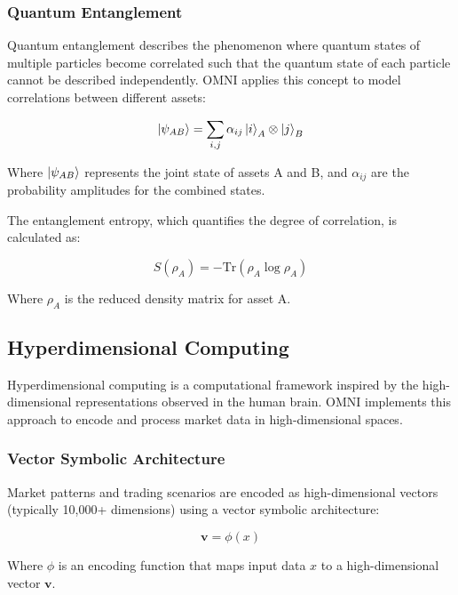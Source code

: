 \documentclass[11pt,a4paper]{article}
\begin{document}
\subsubsection{Quantum Entanglement}

Quantum entanglement describes the phenomenon where quantum states of multiple particles become correlated such that the quantum state of each particle cannot be described independently. OMNI applies this concept to model correlations between different assets:

\begin{equation}
    \ket{\psi_{AB}} = \sum_{i,j} \alpha_{ij} \ket{i}_A \otimes \ket{j}_B
\end{equation}

Where $\ket{\psi_{AB}}$ represents the joint state of assets A and B, and $\alpha_{ij}$ are the probability amplitudes for the combined states.

The entanglement entropy, which quantifies the degree of correlation, is calculated as:

\begin{equation}
    S(\rho_A) = -\text{Tr}(\rho_A \log \rho_A)
\end{equation}

Where $\rho_A$ is the reduced density matrix for asset A.

\subsection{Hyperdimensional Computing}

Hyperdimensional computing is a computational framework inspired by the high-dimensional representations observed in the human brain. OMNI implements this approach to encode and process market data in high-dimensional spaces.

\subsubsection{Vector Symbolic Architecture}

Market patterns and trading scenarios are encoded as high-dimensional vectors (typically 10,000+ dimensions) using a vector symbolic architecture:

\begin{equation}
    \mathbf{v} = \phi(x)
\end{equation}

Where $\phi$ is an encoding function that maps input data $x$ to a high-dimensional vector $\mathbf{v}$.
\end{document}
